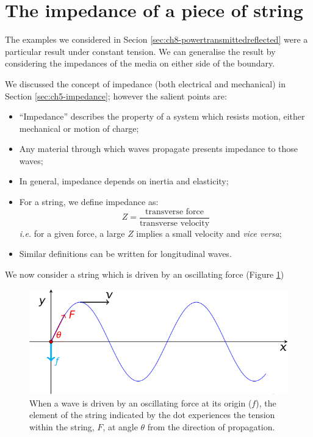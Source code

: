 \documentclass[
]{book}
\providecommand{\tightlist}{%
  \setlength{\itemsep}{0pt}\setlength{\parskip}{0pt}}
\begin{document}
\hypertarget{sec:ch8-stringimpedeance}{%
\section{The impedance of a piece of string}\label{sec:ch8-stringimpedeance}}

The examples we considered in Secion \ref{sec:ch8-powertransmittedreflected} were a particular result under constant tension. We can generalise the result by considering the impedances of the media on either side of the boundary.

We discussed the concept of impedance (both electrical and mechanical) in Section \ref{sec:ch5-impedance}; however the salient points are:

\begin{itemize}
\tightlist
\item
  ``Impedance'' describes the property of a system which resists motion, either mechanical or motion of charge;
\item
  Any material through which waves propagate presents impedance to those waves;
\item
  In general, impedance depends on inertia and elasticity;
\item
  For a string, we define impedance as:
  \begin{equation}
  Z = \frac{\textrm{transverse force}}{\textrm{transverse velocity}}
  \end{equation}
  \emph{i.e.} for a given force, a large \(Z\) implies a small velocity and \emph{vice versa};
\item
  Similar definitions can be written for longitudinal waves.
\end{itemize}

We now consider a string which is driven by an oscillating force (Figure \ref{fig:ch8-impedencestring1})

\begin{figure}

{\centering \includegraphics[width=0.7\linewidth]{visualisations/LaTeX/ch8-wavesonstrings3} 

}

\caption{When a wave is driven by an oscillating force at its origin ($f$), the element of the string indicated by the dot experiences the tension within the string, $F$, at angle $\theta$ from the direction of propagation.}\label{fig:ch8-impedencestring1}
\end{figure}
\end{document}
